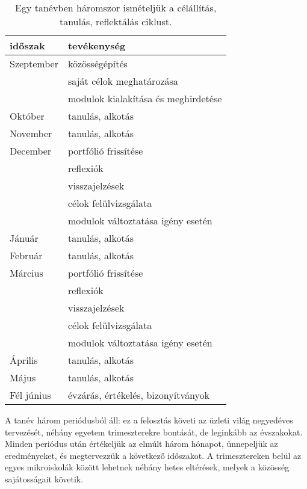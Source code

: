 			\begin{table}
\centering
				\begin{tabular}{ l|l }
    \textbf{időszak} & \textbf{tevékenység}\\
    \hline
    Szeptember&
    közösségépítés \\
  & saját célok meghatározása \\
  & modulok kialakítása és meghirdetése
  \\ \hline

    Október&
    tanulás, alkotás
  \\ \hline

    November&
    tanulás, alkotás
  \\ \hline

    December&
    portfólió frissítése\\
    & reflexiók \\
    & visszajelzések \\
    & célok felülvizsgálata \\
    & modulok változtatása igény esetén
  \\ \hline

    Jánuár&
    tanulás, alkotás
  \\ \hline

    Február&
    tanulás, alkotás
  \\ \hline

    Március&
    portfólió frissítése \\
    & reflexiók\\
    & visszajelzések \\
    & célok felülvizsgálata \\
    & modulok változtatása igény esetén
  \\ \hline

    Április&
    tanulás, alkotás
  \\ \hline

    Május&
    tanulás, alkotás
  \\ \hline

    Fél június&
    évzárás, értékelés, bizonyítványok
    \end{tabular}
    \caption{Egy tanévben háromszor ismételjük a célállítás, tanulás, reflektálás ciklust.}
    \label{tbl:tanevritmus}
  \end{table}


A tanév három periódusból áll: ez a felosztás követi az üzleti világ negyedéves tervezését, néhány egyetem trimeszterekre bontását, de leginkább az évszakokat. Minden periódus után értékeljük az elmúlt három hónapot, ünnepeljük az eredményeket, és megtervezzük a következő időszakot.  A trimesztereken belül az egyes mikroiskolák között lehetnek néhány hetes eltérések, melyek a közösség sajátosságait követik.

